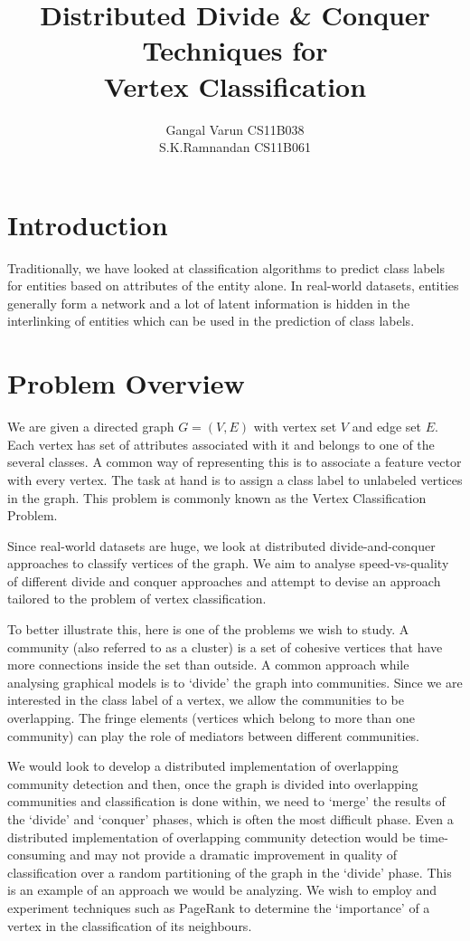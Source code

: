\documentclass{article}
\begin{document}
\title{\textbf{Distributed Divide \& Conquer Techniques for \\Vertex Classification}}
\author{ Gangal Varun CS11B038 \\
		 S.K.Ramnandan CS11B061\\
[0.2in]
}
\date{}
\maketitle
\section*{Introduction}
Traditionally, we have looked at classification algorithms to predict class labels for entities based on attributes of the entity alone. In real-world datasets, entities generally form a network and a lot of latent information is hidden in the interlinking of entities which can be used in the prediction of class labels. 

\section*{Problem Overview}
We are given a directed graph $G=(V,E)$ with vertex set $V$ and edge set $E$. Each vertex has set of attributes associated with it and belongs to one of the several classes. A common way of representing this is to associate a feature vector with every vertex. The task at hand is to assign a class label to unlabeled vertices in the graph. This problem is commonly known as the Vertex Classification Problem. 

Since real-world datasets are huge, we look at distributed divide-and-conquer approaches to classify vertices of the graph. We aim to analyse speed-vs-quality of different divide and conquer approaches and attempt to devise an approach tailored to the problem of vertex classification. 

To better illustrate this, here is one of the problems we wish to study. A community (also referred to as a cluster) is a set of cohesive vertices that have more connections inside the set than outside. A common approach while analysing graphical models is to ‘divide’ the graph into communities. Since we are interested in the class label of a vertex, we allow the communities to be overlapping. The fringe elements (vertices which belong to more than one community) can play the role of mediators between different communities. 

We would look to develop a distributed implementation of overlapping community detection and then, once the graph is divided into overlapping communities and classification is done within, we need to ‘merge’ the results of the ‘divide’ and ‘conquer’ phases, which is often the most difficult phase. Even a distributed implementation of overlapping community detection would be time-consuming and may not provide a dramatic improvement in quality of classification over a random partitioning of the graph in the ‘divide’ phase. This is an example of an approach we would be analyzing. We wish to employ and experiment techniques such as PageRank to determine the ‘importance’ of a vertex in the classification of its neighbours.
\end{document}
